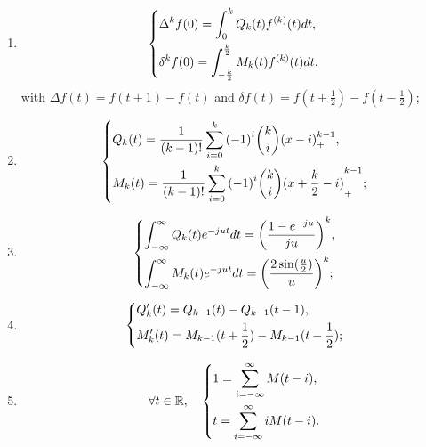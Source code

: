 \begin{prop}\label{prop:sch-B-splines}
  \begin{enumerate}
    \item \begin{equation*}
	\begin{dcases} \Delta^k f(0) = \int_0^k Q_k(t)f^{(k)}(t) dt, \\ 
	  \delta^k f(0) = \int_{-\frac{k}{2}}^{\frac{k}{2}}M_k(t)f^{(k)}(t)dt.
	\end{dcases}
      \end{equation*}
      with $\Delta f(t) = f(t+1)-f(t)$  and $\delta f(t) = f(t+\frac{1}{2})-f(t-\frac{1}{2})$;
    \item \begin{equation*}
	\begin{dcases}
	  Q_k(t) = \frac{1}{(k-1)!} \sum_{i=0}^k {(-1)}^{i} \dbinom{k}{i} {(x-i)}_+^{k-1}, \\
	  M_k(t) = \frac{1}{(k-1)!}\sum_{i=0}^k {(-1)}^{i} \dbinom{k}{i} {(x+\frac{k}{2}-i)}_+^{k-1};
	\end{dcases}
      \end{equation*}
    \item 
      \begin{equation*}
	\begin{dcases}
	  \int_{-\infty}^{\infty} Q_k(t) e^{-jut}dt = {\left(\frac{1-e^{-ju}}{ju}\right)}^k, \\
	  \int_{-\infty}^{\infty} M_k(t) e^{-jut}dt = {\left(\frac{2\sin(\frac{u}{2})}{u}\right)}^k;
	\end{dcases}
      \end{equation*}
    \item
      \begin{equation*}
	\begin{dcases}
	  Q_k'(t) = Q_{k-1}(t) - Q_{k-1}(t-1), \\
	  M_k'(t) = M_{k-1}(t+\frac{1}{2}) - M_{k-1}(t-\frac{1}{2});
	\end{dcases}
      \end{equation*}
    \item 
      \begin{equation*}
	\forall t \in \mathbb{R}, \quad
	\begin{dcases}
	  1 = \sum_{i=-\infty}^{\infty} M(t - i), \\ 
	  t = \sum_{i=-\infty}^{\infty} i M(t - i).
	\end{dcases}
      \end{equation*}
  \end{enumerate}
\end{prop}
